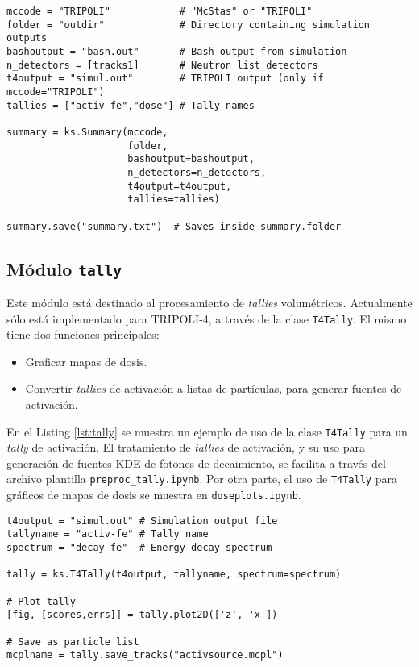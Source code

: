 \begin{lstlisting}[language=Python2, label={lst:summary}, caption=Ejemplo de uso de \texttt{Summary}.]
mccode = "TRIPOLI"            # "McStas" or "TRIPOLI"
folder = "outdir"             # Directory containing simulation outputs
bashoutput = "bash.out"       # Bash output from simulation
n_detectors = [tracks1]       # Neutron list detectors
t4output = "simul.out"        # TRIPOLI output (only if mccode="TRIPOLI")
tallies = ["activ-fe","dose"] # Tally names

summary = ks.Summary(mccode,
                     folder,
                     bashoutput=bashoutput, 
                     n_detectors=n_detectors, 
                     t4output=t4output,
                     tallies=tallies)

summary.save("summary.txt")  # Saves inside summary.folder
\end{lstlisting}


\subsection{Módulo \texttt{tally}}

Este módulo está destinado al procesamiento de \emph{tallies} volumétricos. Actualmente sólo está implementado para TRIPOLI-4, a través de la clase \verb|T4Tally|. El mismo tiene dos funciones principales:
\begin{itemize}
	\item Graficar mapas de dosis.
	\item Convertir \emph{tallies} de activación a listas de partículas, para generar fuentes de activación.
\end{itemize}

En el Listing \ref{lst:tally} se muestra un ejemplo de uso de la clase \verb|T4Tally| para un \emph{tally} de activación. El tratamiento de \emph{tallies} de activación, y su uso para generación de fuentes KDE de fotones de decaimiento, se facilita a través del archivo plantilla \verb|preproc_tally.ipynb|. Por otra parte, el uso de \verb|T4Tally| para gráficos de mapas de dosis se muestra en \verb|doseplots.ipynb|.

\begin{lstlisting}[language=Python2, label={lst:tally}, caption=Ejemplo de uso de \texttt{T4Tally}.]
t4output = "simul.out" # Simulation output file
tallyname = "activ-fe" # Tally name
spectrum = "decay-fe"  # Energy decay spectrum

tally = ks.T4Tally(t4output, tallyname, spectrum=spectrum)

# Plot tally
[fig, [scores,errs]] = tally.plot2D(['z', 'x'])

# Save as particle list
mcplname = tally.save_tracks("activsource.mcpl")
\end{lstlisting}



